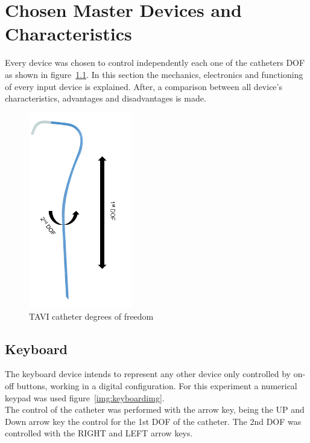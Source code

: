 
\chapter{Chosen Master Devices and Characteristics}\label{chosenDevices}
Every device was chosen to control independently each one of the catheters DOF as shown in figure~\ref{img:dofi}. In this section the mechanics, electronics and functioning of every input device is explained. After, a comparison between all device's characteristics, advantages and disadvantages is made.

\begin{figure}[ht]
   \centering
   \includegraphics[width=0.4\textwidth]{img/Dof.PNG}
   \caption{TAVI catheter degrees of freedom}
   \label{img:dofi}
\end{figure}

\section{Keyboard}\label{sec:keyboard}
The keyboard device intends to represent any other device only controlled by on-off buttons, working in a digital configuration. For this experiment a numerical keypad was used figure~\ref{img:keyboardimg}.\\

The control of the catheter was performed with the arrow key, being the UP and Down arrow key the control for the 1st DOF of the catheter. The 2nd DOF was controlled with the RIGHT and LEFT arrow keys.\\

